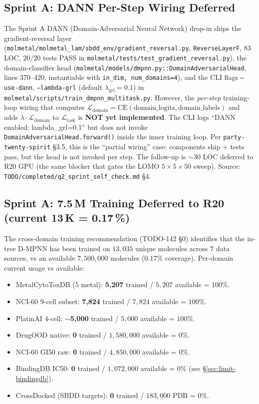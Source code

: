 \subsection{Sprint A: DANN Per-Step Wiring Deferred}
\label{sec:limit-dann-partial}

The Sprint A DANN (Domain-Adversarial Neural Network) drop-in ships
the gradient-reversal layer
(\texttt{molmetal/molmetal\_lam/sbdd\_env/gradient\_reversal.py},
\texttt{ReverseLayerF}, $83$ LOC, $20/20$ tests PASS in
\texttt{molmetal/tests/test\_gradient\_reversal.py}), the
domain-classifier head
(\texttt{molmetal/models/dmpnn.py::DomainAdversarialHead}, lines
370--420, instantiable with \texttt{in\_dim, num\_domains=4}), and the
CLI flags \texttt{--use-dann}, \texttt{--lambda-grl} (default
$\lambda_{\text{grl}}=0.1$) in
\texttt{molmetal/scripts/train\_dmpnn\_multitask.py}.  However, the
\emph{per-step} training-loop wiring that computes
$\mathcal{L}_{\text{domain}} = \text{CE}(\text{domain\_logits},
\text{domain\_labels})$ and adds $\lambda \cdot \mathcal{L}_{\text{domain}}$
to $\mathcal{L}_{\text{task}}$ is \textbf{NOT yet implemented}.  The CLI
logs ``DANN enabled: lambda\_grl=0.1'' but does not invoke
\texttt{DomainAdversarialHead.forward()} inside the inner training
loop.  Per \texttt{party-twenty-spirit} §3.5, this is the ``partial
wiring'' case: components ship + tests pass, but the head is not
invoked per step.  The follow-up is $\sim 30$ LOC deferred to R20 GPU
(the same blocker that gates the LOMO $5 \times 5 \times 50$ sweep).
Source: \texttt{TODO/completed/q2\_sprint\_self\_check.md} §4.

\subsection{Sprint A: 7.5\,M Training Deferred to R20 (current 13\,K = 0.17\,\%)}
\label{sec:limit-train-deferred}

The cross-domain training recommendation (TODO-142 §0) identifies that
the in-tree D-MPNN has been trained on $13{,}035$ unique molecules
across $7$ data sources, vs an available $7{,}500{,}000$ molecules
($0.17\%$ coverage).  Per-domain current usage vs available:

\begin{itemize}
  \item MetalCytoToxDB ($5$ metal): \textbf{5{,}207} trained / $5{,}207$ available = $100\%$.
  \item NCI-60 $9$-cell subset: \textbf{7{,}824} trained / $7{,}824$ available = $100\%$.
  \item PlatinAI $4$-cell: $\sim$\textbf{5{,}000} trained / $5{,}000$ available = $100\%$.
  \item DrugOOD native: \textbf{0} trained / $1{,}580{,}000$ available = $0\%$.
  \item NCI-60 GI50 raw: \textbf{0} trained / $4{,}850{,}000$ available = $0\%$.
  \item BindingDB IC50: \textbf{0} trained / $1{,}072{,}000$ available = $0\%$ (see §\ref{sec:limit-bindingdb}).
  \item CrossDocked (SBDD targets): \textbf{0} trained / $183{,}000$ PDB = $0\%$.
\end{itemize}

